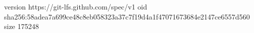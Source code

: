 version https://git-lfs.github.com/spec/v1
oid sha256:58adea7a699ce48c8eb058323a37c7f19d4a1f47071673684e2147ce6557d560
size 175248
